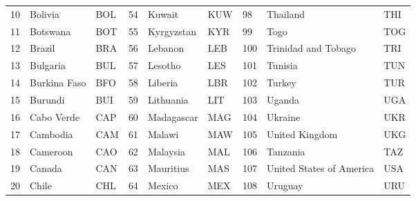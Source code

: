 \begin{table}[!htb]
{\begin{tabular}{@{}rllllllll@{}}
			10                               & Bolivia            & BOL          & 54           & Kuwait                & KUW                   & 98           & Thailand                 & THI                   \\
			11                               & Botswana           & BOT          & 55           & Kyrgyzstan            & KYR                   & 99           & Togo                     & TOG                   \\
			12                               & Brazil             & BRA          & 56           & Lebanon               & LEB                   & 100          & Trinidad and Tobago      & TRI                   \\
			13                               & Bulgaria           & BUL          & 57           & Lesotho               & LES                   & 101          & Tunisia                  & TUN                   \\
			14                               & Burkina Faso       & BFO          & 58           & Liberia               & LBR                   & 102          & Turkey                   & TUR                   \\
			15                               & Burundi            & BUI          & 59           & Lithuania             & LIT                   & 103          & Uganda                   & UGA                   \\
			16                               & Cabo Verde         & CAP          & 60           & Madagascar            & MAG                   & 104          & Ukraine                  & UKR                   \\
			17                               & Cambodia           & CAM          & 61           & Malawi                & MAW                   & 105          & United Kingdom           & UKG                   \\
			18                               & Cameroon           & CAO          & 62           & Malaysia              & MAL                   & 106          & Tanzania                 & TAZ                   \\
			19                               & Canada             & CAN          & 63           & Mauritius             & MAS                   & 107          & United States of America & USA                   \\
			20                               & Chile              & CHL          & 64           & Mexico                & MEX                   & 108          & Uruguay                  & URU                   \\

\end{tabular}}
\end{table}

